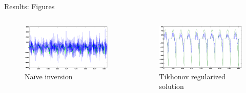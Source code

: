 \documentclass[final]{beamer}
\begin{document}
\begin{frame}[t]
\begin{columns}[t]
\begin{column}{.465\textwidth}
\begin{block}{Results: Figures}
\begin{columns}
\begin{column}{.5\textwidth}
\begin{center}
\begin{figure}
\includegraphics[width=.95\linewidth]{naive_test_nocrime.eps}
\caption{Naïve inversion}
\label{fig:naive}
\end{figure}
\end{center}
\end{column}

\begin{column}{.5\textwidth}
\begin{center}
\begin{figure}
\includegraphics[width=.9\linewidth]{naive_test_nocrime_morozov.eps}
\caption{Tikhonov regularized solution}
\label{fig:naive-tik}
\end{figure}
\end{center}
\end{column}

\end{columns}

\vspace{1cm}

\begin{columns}


\end{columns}
\end{block}
\end{column}
\end{columns}
\end{frame}
\end{document}
